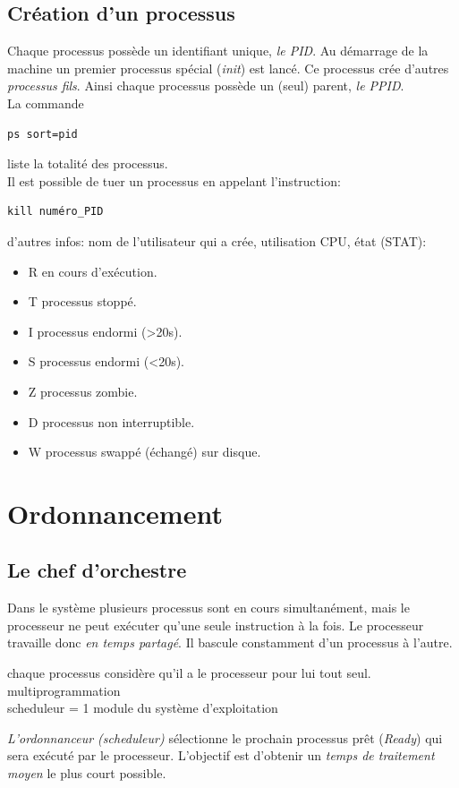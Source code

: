 \documentclass[a4paper,11pt]{article}
\begin{document}
\begin{Form}
\subsection{Création d'un processus}
Chaque processus possède un identifiant unique, \emph{le PID}. Au démarrage de la machine un premier processus spécial  (\emph{init}) est lancé. Ce processus crée d'autres \emph{processus fils}. Ainsi chaque processus possède un (seul) parent, \emph{le PPID}.\\
La commande
\begin{lstlisting}
ps sort=pid
\end{lstlisting}
liste la totalité des processus.\\
Il est possible de tuer un processus en appelant l'instruction:
\begin{lstlisting}
kill numéro_PID
\end{lstlisting}
\begin{commentprof}
d'autres infos: nom de l'utilisateur qui a crée, utilisation CPU, état (STAT):
\begin{itemize}
\item R en cours d'exécution.
\item T processus stoppé.
\item I processus endormi (>20s).
\item S processus endormi (<20s).
\item Z processus zombie.
\item D processus non interruptible.
\item W processus swappé (échangé) sur disque. 
\end{itemize}
\end{commentprof}
\section{Ordonnancement}
\subsection{Le chef d'orchestre}
Dans le système plusieurs processus sont en cours simultanément, mais le processeur ne peut exécuter qu’une seule instruction à la fois. Le processeur travaille donc \emph{en temps partagé}. Il bascule constamment d’un processus à l’autre.\\
\begin{commentprof}
chaque processus considère qu'il a le processeur pour lui tout seul. multiprogrammation\\
scheduleur = 1 module du système d'exploitation
\end{commentprof}
\emph{L'ordonnanceur (scheduleur)} sélectionne le prochain processus prêt (\emph{Ready}) qui sera exécuté par le processeur. L'objectif est d'obtenir un \emph{temps de traitement moyen} le plus court possible.

\end{Form}
\end{document}
